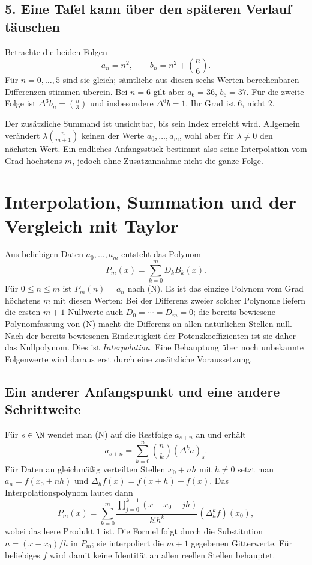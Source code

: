 \subsection*{5. Eine Tafel kann über den späteren Verlauf täuschen}

Betrachte die beiden Folgen
\[
 a_n=n^2,\qquad b_n=n^2+\binom n6.
\]
Für $n=0,\ldots,5$ sind sie gleich; sämtliche aus diesen sechs
Werten berechenbaren Differenzen stimmen überein. Bei $n=6$ gilt
aber $a_6=36$, $b_6=37$. Für die zweite Folge ist
$\Delta^3b_n=\binom n3$ und insbesondere $\Delta^6b=1$.
Ihr Grad ist $6$, nicht $2$.

Der zusätzliche Summand ist unsichtbar, bis sein Index erreicht wird.
Allgemein verändert $\lambda\binom n{m+1}$ keinen der Werte
$a_0,\ldots,a_m$, wohl aber für $\lambda\ne0$ den nächsten Wert.
Ein endliches Anfangsstück bestimmt also seine Interpolation vom
Grad höchstens $m$, jedoch ohne Zusatzannahme nicht die ganze Folge.

\section{Interpolation, Summation und der Vergleich mit Taylor}

Aus beliebigen Daten $a_0,\ldots,a_m$ entsteht das Polynom
\[
 P_m(x)=\sum_{k=0}^mD_kB_k(x).
\]
Für $0\leq n\leq m$ ist $P_m(n)=a_n$ nach (N).
Es ist das einzige Polynom vom Grad höchstens $m$ mit diesen Werten:
Bei der Differenz zweier solcher Polynome liefern die ersten
$m+1$ Nullwerte auch $D_0=\cdots=D_m=0$; die bereits bewiesene
Polynomfassung von (N) macht die Differenz an allen natürlichen Stellen null. Nach der bereits bewiesenen Eindeutigkeit der Potenzkoeffizienten ist sie daher das Nullpolynom.
Dies ist \emph{Interpolation}. Eine Behauptung über noch unbekannte
Folgenwerte wird daraus erst durch eine zusätzliche Voraussetzung.

\subsection*{Ein anderer Anfangspunkt und eine andere Schrittweite}

Für $s\in\N$ wendet man (N) auf die Restfolge $a_{s+n}$ an und erhält
\[
 a_{s+n}=\sum_{k=0}^n\binom nk(\Delta^ka)_s.
\]
Für Daten an gleichmäßig verteilten Stellen $x_0+nh$ mit $h\ne0$
setzt man $a_n=f(x_0+nh)$ und
$\Delta_h f(x)=f(x+h)-f(x)$. Das Interpolationspolynom lautet dann
\[
 P_m(x)=\sum_{k=0}^m
 \frac{\prod_{j=0}^{k-1}(x-x_0-jh)}{k!h^k}
 (\Delta_h^k f)(x_0),
\]
wobei das leere Produkt $1$ ist. Die Formel folgt durch die
Substitution $n=(x-x_0)/h$ in $P_m$; sie interpoliert die
$m+1$ gegebenen Gitterwerte. Für beliebiges $f$ wird damit keine
Identität an allen reellen Stellen behauptet.

